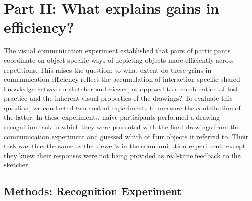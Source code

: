 \documentclass[10pt,letterpaper]{article}
\begin{document}




\section{Part II: What explains gains in efficiency?}

The visual communication experiment established that pairs of participants coordinate on object-specific ways of depicting objects more efficiently across repetitions.
This raises the question: to what extent do these gains in communication efficiency reflect the accumulation of interaction-specific shared knowledge between a sketcher and viewer, as opposed to a combination of task practice and the inherent visual properties of the drawings?
To evaluate this question, we conducted two control experiments to measure the contribution of the latter.
In these experiments, naive participants performed a drawing recognition task in which they were presented with the final drawings from the communication experiment and guessed which of four objects it referred to.
Their task was thus the same as the viewer's in the communication experiment, except they knew their responses were not being provided as real-time feedback to the sketcher.


\subsection{Methods: Recognition Experiment}
\end{document}
